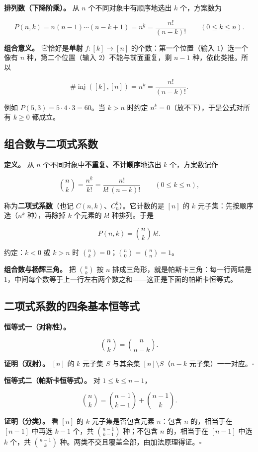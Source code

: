 \textbf{排列数（下降阶乘）。} 从 $n$ 个不同对象中有顺序地选出 $k$ 个，方案数为

\[
P(n,k)=n(n-1)\cdots(n-k+1)=n^{\underline{k}}=\frac{n!}{(n-k)!}\qquad(0\le k\le n).
\]

\textbf{组合意义。} 它恰好是\textbf{单射} $f:[k]\to[n]$ 的个数：第一个位置（输入 $1$）选一个像有 $n$ 种，第二个位置（输入 $2$）不能与前面重复，剩 $n-1$ 种，依此类推。所以

\[
\#\operatorname{inj}([k],[n])=n^{\underline{k}}=\frac{n!}{(n-k)!}.
\]

例如 $P(5,3)=5\cdot4\cdot3=60$。当 $k>n$ 时约定 $n^{\underline{k}}=0$（放不下），于是公式对所有 $k\ge0$ 都成立。

\subsection{组合数与二项式系数}


\textbf{定义。} 从 $n$ 个不同对象中\textbf{不重复、不计顺序}地选出 $k$ 个，方案数记作

\[
\binom nk=\frac{n^{\underline{k}}}{k!}=\frac{n!}{k!\,(n-k)!}\qquad(0\le k\le n),
\]

称为\textbf{二项式系数}（也记 $C(n,k)$、$C_n^k$）。它计数的是 $[n]$ 的 $k$ 元子集：先按顺序选（$n^{\underline{k}}$ 种），再除掉 $k$ 个元素的 $k!$ 种排列。于是

\[
P(n,k)=\binom nk\,k! .
\]

约定：$k<0$ 或 $k>n$ 时 $\binom nk=0$；$\binom n0=\binom nn=1$。

\textbf{组合数与杨辉三角。} 把 $\binom nk$ 按 $n$ 排成三角形，就是帕斯卡三角：每一行两端是 $1$，中间每个数等于上一行左右两个数之和——这正是下面的帕斯卡恒等式。

\subsection{二项式系数的四条基本恒等式}


\textbf{恒等式一（对称性）。}

\[
\binom nk=\binom n{n-k}.
\]

\textbf{证明（双射）。} $[n]$ 的 $k$ 元子集 $S$ 与其余集 $[n]\setminus S$（$n-k$ 元子集）一一对应。$\square$

\textbf{恒等式二（帕斯卡恒等式）。} 对 $1\le k\le n-1$，

\[
\binom nk=\binom{n-1}{k-1}+\binom{n-1}{k}.
\]

\textbf{证明（分类）。} 看 $[n]$ 的 $k$ 元子集是否包含元素 $n$：包含 $n$ 的，相当于在 $[n-1]$ 中再选 $k-1$ 个，共 $\binom{n-1}{k-1}$ 种；不包含 $n$ 的，相当于在 $[n-1]$ 中选 $k$ 个，共 $\binom{n-1}{k}$ 种。两类不交且覆盖全部，由加法原理得证。$\square$

